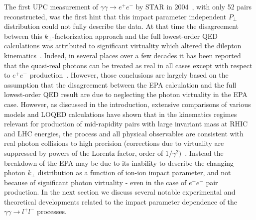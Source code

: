 \documentclass[12pt,epjc3]{svjour3}\sloppy
\begin{document}
The first UPC measurement of $\gamma\gamma \rightarrow e^+e^-$ by STAR in 2004~\cite{starcollaborationProductionEnsuremathPairs2004}, with only 52 pairs reconstructed, was the first hint that this impact parameter independent $P_\perp$ distribution could not fully describe the data.
At that time the disagreement between this $k_\perp$-factorization approach and the full lowest-order QED calculations was attributed to significant virtuality which altered the dilepton kinematics~\cite{baltzTwophotonInteractionsNuclear2009,starcollaborationProductionEnsuremathPairs2004}. 
Indeed, in several places over a few decades it has been reported that the quasi-real photons can be treated as real in all cases except with respect to $e^+e^-$ production~\cite{bertulaniPhysicsUltraperipheralNuclear2005a,henckenImpactparameterDependenceTotal1995}. 
However, those conclusions are largely based on the assumption that the disagreement between the EPA calculation and the full lowest-order QED result are due to neglecting the photon virtuality in the EPA case. 
However, as discussed in the introduction, extensive comparisons of various models and LOQED calculations have shown that in the kinematics regimes relevant for production of mid-rapidity pairs with large invariant mass at RHIC and LHC energies, the process and all physical observables are consistent with real photon collisions to high precision (corrections due to virtuality are suppressed by powers of the Lorentz factor, order of $1/\gamma^2)$~\cite{PhysRevC.47.2308}.
Instead the breakdown of the EPA may be due to its inability to describe the changing photon $k_\perp$ distribution as a function of ion-ion impact parameter, and not because of significant photon virtuality - even in the case of $e^+e^-$ pair production.
In the next section we discuss several notable experimental and theoretical developments related to the impact parameter dependence of the $\gamma\gamma \rightarrow l^+l^-$ processes.


\end{document}
